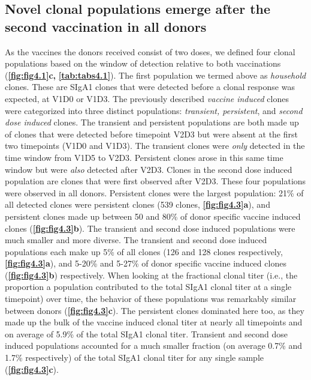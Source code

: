 \subsection{Novel clonal populations emerge after the second vaccination in all donors}
As the vaccines the donors received consist of two doses, we defined four clonal populations based on the window of detection relative to both vaccinations (\textbf{\autoref{fig:fig4.1}c,} \textbf{\autoref{tab:tabs4.1}}). The first population we termed above as \emph{household} clones. These are SIgA1 clones that were detected before a clonal response was expected, at V1D0 or V1D3. The previously described \emph{vaccine induced} clones were categorized into three distinct populations: \emph{transient, persistent}, and \emph{second dose induced} clones. The transient and persistent populations are both made up of clones that were detected before timepoint V2D3 but were absent at the first two timepoints (V1D0 and V1D3). The transient clones were \emph{only} detected in the time window from V1D5 to V2D3. Persistent clones arose in this same time window but were \emph{also} detected after V2D3. Clones in the second dose induced population are clones that were first observed after V2D3.
These four populations were observed in all donors. Persistent clones were the largest population: 21\% of all detected clones were persistent clones (539 clones, \textbf{\autoref{fig:fig4.3}a}), and persistent clones made up between 50 and 80\% of donor specific vaccine induced clones (\textbf{\autoref{fig:fig4.3}b}). The transient and second dose induced populations were much smaller and more diverse. The transient and second dose induced populations each make up 5\% of all clones (126 and 128 clones respectively, \textbf{\autoref{fig:fig4.3}a}), and 5-20\% and 5-27\% of donor specific vaccine induced clones (\textbf{\autoref{fig:fig4.3}b}) respectively. When looking at the fractional clonal titer (i.e., the proportion a population contributed to the total SIgA1 clonal titer at a single timepoint) over time, the behavior of these populations was remarkably similar between donors (\textbf{\autoref{fig:fig4.3}c}). The persistent clones dominated here too, as they made up the bulk of the vaccine induced clonal titer at nearly all timepoints and on average of 5.9\% of the total SIgA1 clonal titer. Transient and second dose induced populations accounted for a much smaller fraction (on average 0.7\% and 1.7\% respectively) of the total SIgA1 clonal titer for any single sample (\textbf{\autoref{fig:fig4.3}c}).
